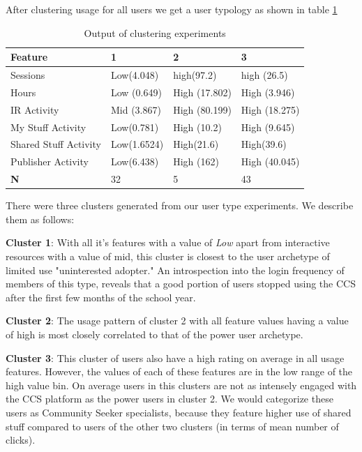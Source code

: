 \documentclass{acm_proc_article-sp}
\begin{document}
After clustering usage for all users we get a user typology as shown in table \ref{usertypology}
\begin{table}
\caption{Output of clustering experiments}
\label{usertypology}
\begin{tabular}{|p{3cm}|p{1.5cm}|p{1.5cm}|p{1.5cm}|}
\hline \textbf{Feature} & 1 &  2 & 3 \\ 
\hline Sessions & Low(4.048)& high(97.2)  & high (26.5)  \\ 
\hline Hours & Low (0.649) & High (17.802) & High (3.946)  \\ 
\hline IR Activity & Mid (3.867) & High (80.199) & High (18.275) \\ 
\hline My Stuff Activity &  Low(0.781)  & High (10.2) & High (9.645)  \\ 
\hline Shared Stuff Activity & Low(1.6524) & High(21.6) & High(39.6) \\
\hline Publisher Activity & Low(6.438) & High (162) & High (40.045)  \\
\hline \textbf{N} & 32 & 5 & 43

\end{tabular}
\end{table} 

There were three clusters generated from our user type experiments. We describe them as follows:

\textbf{Cluster 1}: With all it's features with a value of \textit{Low} apart from interactive resources with a value of mid, this cluster is closest to the user archetype of limited use "uninterested adopter." An introspection into the login frequency of members of this type, reveals that a good portion of users stopped using the CCS after the first few months of the school year.

\textbf{Cluster 2}: The usage pattern of cluster 2 with all feature values having a value of high is most closely correlated to that of the power user archetype.

\textbf{Cluster 3}: This cluster of users also have a high rating on average in all usage features. However, the values of each of these features are in the low range of the high value bin. On average users in this clusters are not as intensely engaged with the CCS platform as the power users in cluster 2. We would categorize these users as Community Seeker specialists, because they feature higher use of shared stuff compared to users of the other two clusters (in terms of mean number of clicks).
\end{document}
